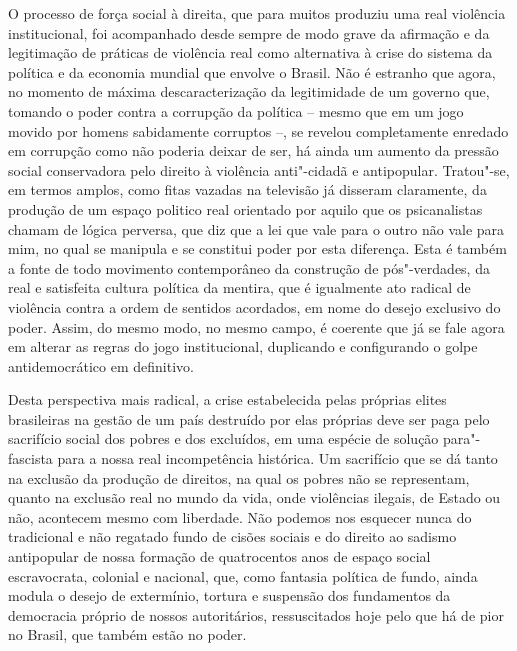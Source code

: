 O processo de força social à direita, que para muitos produziu uma real
violência institucional, foi acompanhado desde sempre de modo grave da
afirmação e da legitimação de práticas de violência real como
alternativa à crise do sistema da política e da economia mundial que
envolve o Brasil. Não é estranho que agora, no momento de máxima
descaracterização da legitimidade de um governo que, tomando o poder
contra a corrupção da política -- mesmo que em um jogo movido por homens
sabidamente corruptos --, se revelou completamente enredado em corrupção
como não poderia deixar de ser, há ainda um aumento da pressão social
conservadora pelo direito à violência anti"-cidadã e antipopular.
Tratou"-se, em termos amplos, como fitas vazadas na televisão já disseram
claramente, da produção de um espaço politico real orientado por aquilo
que os psicanalistas chamam de lógica perversa, que diz que a lei que
vale para o outro não vale para mim, no qual se manipula e se constitui
poder por esta diferença. Esta é também a fonte de todo movimento
contemporâneo da construção de pós"-verdades, da real e satisfeita
cultura política da mentira, que é igualmente ato radical de violência
contra a ordem de sentidos acordados, em nome do desejo exclusivo do
poder. Assim, do mesmo modo, no mesmo campo, é coerente que já se fale
agora em alterar as regras do jogo institucional, duplicando e
configurando o golpe antidemocrático em definitivo.

Desta perspectiva mais radical, a crise estabelecida pelas próprias
elites brasileiras na gestão de um país destruído por elas próprias deve
ser paga pelo sacrifício social dos pobres e dos excluídos, em uma
espécie de solução para"-fascista para a nossa real incompetência
histórica. Um sacrifício que se dá tanto na exclusão da produção de
direitos, na qual os pobres não se representam, quanto na exclusão real
no mundo da vida, onde violências ilegais, de Estado ou não, acontecem
mesmo com liberdade. Não podemos nos esquecer nunca do tradicional e não
regatado fundo de cisões sociais e do direito ao sadismo antipopular de
nossa formação de quatrocentos anos de espaço social escravocrata,
colonial e nacional, que, como fantasia política de fundo, ainda modula
o desejo de extermínio, tortura e suspensão dos fundamentos da
democracia próprio de nossos autoritários, ressuscitados hoje pelo que
há de pior no Brasil, que também estão no poder.

